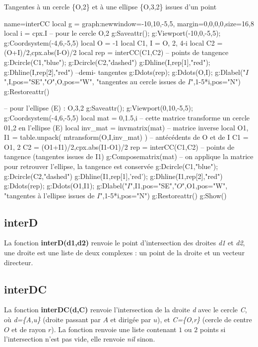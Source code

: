 \begin{demo}{Tangentes à un cercle \{O,2\} et à une ellipse \{O,3,2\} issues d'un point}
\begin{luadraw}{name=interCC}
local g = graph:new{window={-10,10,-5,5}, margin={0,0,0,0},size={16,8}}
local i = cpx.I
-- pour le cercle {O,2}
g:Saveattr(); g:Viewport(-10,0,-5,5); g:Coordsystem(-4,6,-5,5)
local O = -1 
local C1, I = {O, 2}, 4-i
local C2 = {(O+I)/2,cpx.abs(I-O)/2}
local rep = interCC(C1,C2) -- points de tangence
g:Dcircle(C1,"blue"); g:Dcircle(C2,"dashed")
g:Dhline(I,rep[1],"red"); g:Dhline(I,rep[2],"red")  --demi- tangentes
g:Ddots(rep); g:Ddots({O,I}); g:Dlabel("$I$",I,{pos="SE"},"$O$",O,{pos="W"},
    "tangentes au cercle issues de $I$",1-5*i,{pos="N"})
g:Restoreattr()

-- pour l'ellipse (E) : {O,3,2}
g:Saveattr(); g:Viewport(0,10,-5,5); g:Coordsystem(-4,6,-5,5)
local mat = {0,1.5,i} -- cette matrice transforme un cercle {01,2} en l'ellipse (E)
local inv_mat = invmatrix(mat) -- matrice inverse
local O1, I1 = table.unpack( mtransform({O,I},inv_mat) ) -- antécédents de O et de I
C1 = {O1, 2}
C2 = {(O1+I1)/2,cpx.abs(I1-O1)/2}
rep = interCC(C1,C2) -- points de tangence (tangentes issues de I1)
g:Composematrix(mat) -- on applique la matrice pour retrouver l'ellipse, la tangence est conservée
g:Dcircle(C1,"blue"); g:Dcircle(C2,"dashed")
g:Dhline(I1,rep[1],'red'); g:Dhline(I1,rep[2],"red")
g:Ddots(rep); g:Ddots({O1,I1}); g:Dlabel("$I$",I1,{pos="SE"},"$O$",O1,{pos="W"},
    "tangentes à l'ellipse issues de $I$",1-5*i,{pos="N"})
g:Restoreattr()
g:Show()
\end{luadraw}
\end{demo}

\subsection{interD}
La fonction \textbf{interD(d1,d2)} renvoie le point d'intersection des droites \emph{d1} et \emph{d2}, une droite est une liste de deux complexes : un point de la droite et un vecteur directeur.

\subsection{interDC}
La fonction \textbf{interDC(d,C)} renvoie l'intersection de la droite \emph{d} avec le cercle \emph{C}, où \emph{d=\{A,u\}} (droite passant par $A$ et dirigée par $u$), et \emph{C=\{O,r\}} (cercle de centre $O$ et de rayon $r$). La fonction renvoie une liste contenant $1$ ou $2$ points  si l'intersection n'est pas vide, elle renvoie \emph{nil} sinon.


